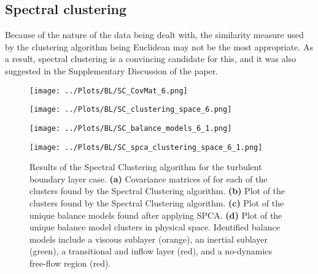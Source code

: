 \documentclass[12pt]{report} %
\begin{document}
\subsection{Spectral clustering}

Because of the nature of the data being dealt with, the similarity measure used by the clustering algorithm being Euclidean may not be the most appropriate\cite{luxburg2007tutorial}. As a result, spectral clustering is a convincing candidate for this, and it was also suggested in the Supplementary Discussion of the paper\cite[Supplementary Information]{callaham2021learning}.

\begin{figure}[htbp]
  \centering

  \begin{minipage}{0.7\textwidth}
    \centering
    \texttt{[image: ../Plots/BL/SC\_CovMat\_6.png]}
    \subcaption{}
  \end{minipage}

  \begin{minipage}{\textwidth}
      \begin{minipage}[b]{0.6\textwidth}
          \centering
          \texttt{[image: ../Plots/BL/SC\_clustering\_space\_6.png]}
          \subcaption{}
      \end{minipage}
      \begin{minipage}[b]{0.35\textwidth}
          \centering
          \texttt{[image: ../Plots/BL/SC\_balance\_models\_6\_1.png]}
          \subcaption{}
      \end{minipage}
  \end{minipage}

  \begin{minipage}{0.7\textwidth}
      \centering
      \texttt{[image: ../Plots/BL/SC\_spca\_clustering\_space\_6\_1.png]}
      \subcaption{}
  \end{minipage}

  \caption{Results of the Spectral Clustering algorithm for the turbulent boundary layer case. \textbf{(a)} Covariance matrices of for each of the clusters found by the Spectral Clustering algorithm. \textbf{(b)} Plot of the clusters found by the Spectral Clustering algorithm. \textbf{(c)} Plot of the unique balance models found after applying SPCA. \textbf{(d)} Plot of the unique balance model clusters in physical space. Identified balance models include a viscous sublayer (orange), an inertial sublayer (green), a transitional and inflow layer (red), and a no-dynamics free-flow region (red).}

  \label{fig:SC_results}
\end{figure}
\end{document}
